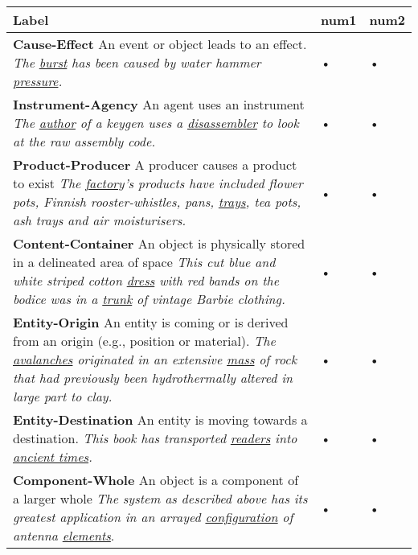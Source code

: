 \begin{tabular}{|p{10cm}|p{1cm}|p{1cm}|}
\hline 
Label & num1 & num2 \\ 
\hline 
\textbf{Cause-Effect} 
\newline  An event or object leads to an effect. 
\newline  \textit{The \underline{burst} has been caused by water hammer \underline{pressure}.} & • & •  \\ 
\hline 
\textbf{Instrument-Agency} \newline  An agent uses an instrument 
\newline  \textit{The \underline{author} of a keygen uses a \underline{disassembler} to look at the raw assembly code.} & • & •  \\ 
\hline 
\textbf{Product-Producer} \newline  A producer causes a product to exist 
\newline  \textit{The \underline{factory}'s products have included flower pots, Finnish rooster-whistles, pans, \underline{trays}, tea pots, ash trays and air moisturisers.}  & • & •  \\ 
\hline 
\textbf{Content-Container} \newline An object is physically stored in a delineated area of space 
\newline \textit{This cut blue and white striped cotton \underline{dress} with red bands on the bodice was in a \underline{trunk} of vintage Barbie clothing.}& • & •\\ 
\hline 
\textbf{Entity-Origin} \newline An entity is coming or is derived from an origin (e.g., position or material). 
\newline \textit{The \underline{avalanches} originated in an extensive \underline{mass} of rock that had previously been hydrothermally altered in large part to clay.} & • & • \\ 
\hline 
\textbf{Entity-Destination} \newline An entity is moving towards a destination.
\newline \textit{This book has transported \underline{readers} into \underline{ancient times}.}& • & •\\ 
\hline 
\textbf{Component-Whole} \newline An object is a component of a larger whole 
\newline \textit{The system as described above has its greatest application in an arrayed \underline{configuration} of antenna \underline{elements}}.& • & •\\ 

\end{tabular}
